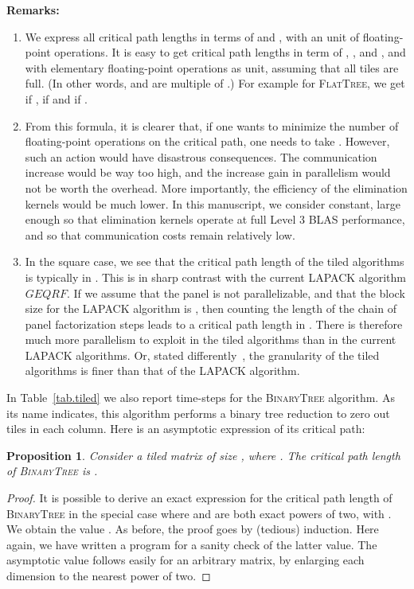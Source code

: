 \documentclass[a4paper,twopages]{article}
\newtheorem{proposition}{Proposition}
\newcommand{\GEQRF}{\ensuremath{\mathit{GEQRF}}\xspace}
\newcommand{\BT}{\textsc{BinaryTree}\xspace}
\newcommand{\FT}{\textsc{FlatTree}\xspace}
\begin{document}
\noindent
\textbf{Remarks:}
\begin{enumerate}

\item We express all critical path lengths in terms of  and , with an unit of
 floating-point operations. It is easy to get critical path
lengths in term of , , and , and with elementary floating-point
operations as unit, assuming that all tiles are full.  (In other words,  and  are
multiple of .) For example for \FT, we get
 if ,
 if 
and  if .

\item From this formula, it is clearer that, if one wants to minimize the number
of floating-point operations on the critical path, one needs to take .
However, such an action would have disastrous consequences. The communication
increase would be way too high, and the increase gain in parallelism would not be
worth the overhead. More importantly, the efficiency of the elimination kernels would 
be much lower.  In this manuscript, we consider  constant, large
enough so that elimination kernels operate at full Level 3 BLAS performance, and so that
communication costs remain relatively low.

\item In the square case, we see that the critical path length of the tiled
algorithms is typically in . This is in sharp contrast
with the current LAPACK algorithm \GEQRF. If we assume that the panel is not
parallelizable, and that the block size for the LAPACK algorithm is , then
counting the length of the chain of panel factorization steps leads to a
critical path length in . There is therefore much more
parallelism to exploit in the tiled algorithms than in the current LAPACK
algorithms. Or, stated differently~\cite{Buttari2008,tileplasma},
the granularity of the tiled algorithms is finer than that of the LAPACK algorithm.

\end{enumerate}

In Table~\ref{tab.tiled} we also report time-steps for the \BT algorithm.
As its name indicates, this algorithm performs a binary tree
reduction to zero out tiles in each column. Here is an asymptotic expression of
its critical path:

\begin{proposition}
\label{th.bt}
Consider a tiled matrix of size , where . The critical
path length of \BT is .
\end{proposition}

\begin{proof}
It is possible to derive an exact expression for the critical path length of
\BT in the special case where  and  are both exact powers of two, with
. We obtain the value .  As before,
the proof goes by (tedious) induction. Here again, we have written a program for
a sanity check of the latter value. The asymptotic value follows easily for an
arbitrary matrix, by enlarging each dimension to the nearest power of two.
\end{proof}
\end{document}

